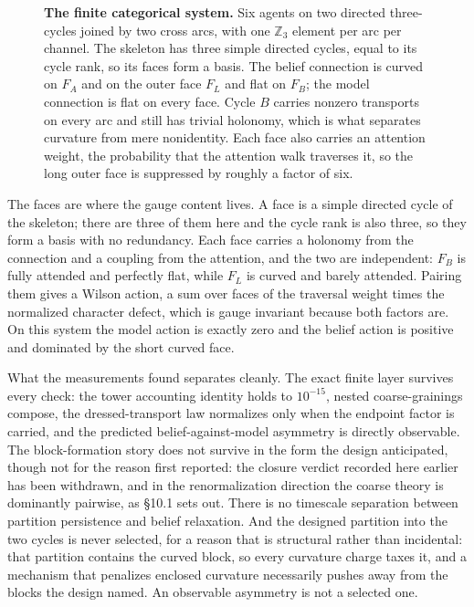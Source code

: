 \documentclass[11pt,letterpaper]{article}
\begin{document}
\begin{figure}[t]
\caption{\textbf{The finite categorical system.} Six agents on two directed
three-cycles joined by two cross arcs, with one $\mathbb Z_3$ element per arc per
channel. The skeleton has three simple directed cycles, equal to its cycle rank, so
its faces form a basis. The belief connection is curved on $F_A$ and on the outer
face $F_L$ and flat on $F_B$; the model connection is flat on every face. Cycle $B$
carries nonzero transports on every arc and still has trivial holonomy, which is
what separates curvature from mere nonidentity. Each face also carries an attention
weight, the probability that the attention walk traverses it, so the long outer face
is suppressed by roughly a factor of six.}
\label{fig:system}
\end{figure}

The faces are where the gauge content lives. A face is a simple directed cycle of the
skeleton; there are three of them here and the cycle rank is also three, so they form
a basis with no redundancy. Each face carries a holonomy from the connection and a
coupling from the attention, and the two are independent: $F_B$ is fully attended and
perfectly flat, while $F_L$ is curved and barely attended. Pairing them gives a
Wilson action, a sum over faces of the traversal weight times the normalized
character defect, which is gauge invariant because both factors are. On this system
the model action is exactly zero and the belief action is positive and dominated by
the short curved face.

What the measurements found separates cleanly. The exact finite layer survives every
check: the tower accounting identity holds to $10^{-15}$, nested coarse-grainings
compose, the dressed-transport law normalizes only when the endpoint factor is
carried, and the predicted belief-against-model asymmetry is directly observable.
The block-formation story does not survive in the form the design anticipated,
though not for the reason first reported: the closure verdict recorded here earlier
has been withdrawn, and in the renormalization direction the coarse theory is
dominantly pairwise, as \S10.1 sets out. There is no timescale separation between
partition persistence and belief relaxation. And the designed partition into the two cycles is never selected,
for a reason that is structural rather than incidental: that partition contains the
curved block, so every curvature charge taxes it, and a mechanism that penalizes
enclosed curvature necessarily pushes away from the blocks the design named. An
observable asymmetry is not a selected one.
\end{document}
